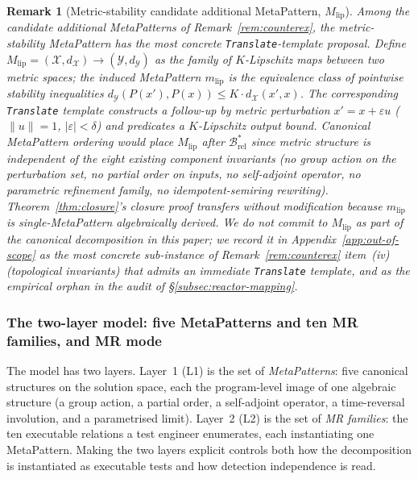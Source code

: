 \documentclass[acmsmall,screen,review]{acmart}
\newtheorem{remark}{Remark}
\begin{document}
\begin{remark}[Metric-stability candidate additional MetaPattern, $M_{\mathrm{lip}}$]
\label{rem:metric-stability-block}
Among the candidate additional MetaPatterns of Remark~\ref{rem:counterex}, the metric-stability MetaPattern has the most concrete \texttt{Translate}-template proposal. Define $M_{\mathrm{lip}} = (\mathcal{X}, d_{\mathcal{X}}) \to (\mathcal{Y}, d_{\mathcal{Y}})$ as the family of $K$-Lipschitz maps between two metric spaces; the induced MetaPattern $m_{\mathrm{lip}}$ is the equivalence class of pointwise stability inequalities $d_{\mathcal{Y}}(P(x'), P(x)) \le K \cdot d_{\mathcal{X}}(x', x)$. The corresponding \texttt{Translate} template constructs a follow-up by metric perturbation $x' = x + \varepsilon u$ ($\|u\| = 1$, $|\varepsilon| < \delta$) and predicates a $K$-Lipschitz output bound. Canonical MetaPattern ordering would place $M_{\mathrm{lip}}$ after $\mathcal{B}^{*}_{\mathrm{rel}}$ since metric structure is independent of the eight existing component invariants (no group action on the perturbation set, no partial order on inputs, no self-adjoint operator, no parametric refinement family, no idempotent-semiring rewriting). Theorem~\ref{thm:closure}'s closure proof transfers without modification because $m_{\mathrm{lip}}$ is single-MetaPattern algebraically derived. We do not commit to $M_{\mathrm{lip}}$ as part of the canonical decomposition in this paper; we record it in Appendix~\ref{app:out-of-scope} as the most concrete sub-instance of Remark~\ref{rem:counterex} item~(iv) (topological invariants) that admits an immediate \texttt{Translate} template, and as the empirical orphan in the audit of \S\ref{subsec:reactor-mapping}.
\end{remark}

\subsubsection{The two-layer model: five MetaPatterns and ten MR families, and MR mode}
\label{subsec:generator-family}

The model has two layers. Layer~1 (L1) is the set of \emph{MetaPatterns}: five canonical structures on the solution space, each the program-level image of one algebraic structure (a group action, a partial order, a self-adjoint operator, a time-reversal involution, and a parametrised limit). Layer~2 (L2) is the set of \emph{MR families}: the ten executable relations a test engineer enumerates, each instantiating one MetaPattern. Making the two layers explicit controls both how the decomposition is instantiated as executable tests and how detection independence is read.
\end{document}

